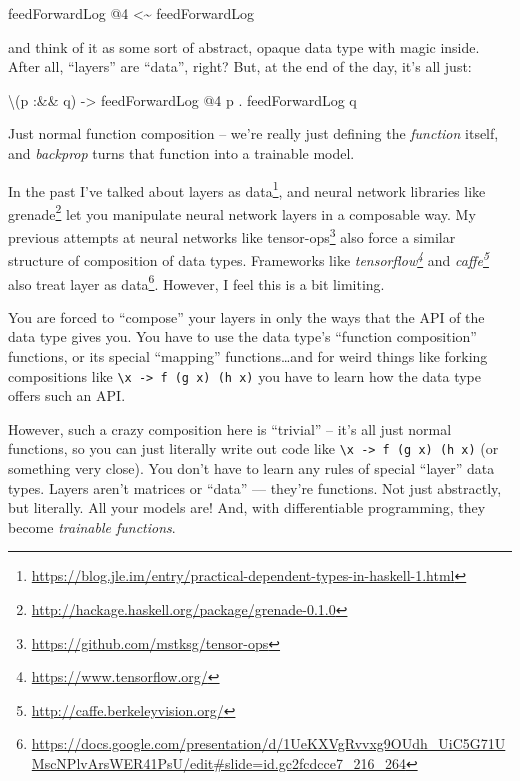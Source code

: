 \documentclass[]{article}
\newenvironment{Shaded}{}{}
\newcommand{\DecValTok}[1]{\textcolor[rgb]{0.25,0.63,0.44}{#1}}
\newcommand{\NormalTok}[1]{#1}
\newcommand{\OperatorTok}[1]{\textcolor[rgb]{0.40,0.40,0.40}{#1}}
\newcommand{\OtherTok}[1]{\textcolor[rgb]{0.00,0.44,0.13}{#1}}
\renewcommand{\href}[2]{#2\footnote{\url{#1}}}
\begin{document}
\begin{Shaded}
\begin{Highlighting}[]
\NormalTok{feedForwardLog }\OperatorTok{@}\DecValTok{4} \OperatorTok{<\textasciitilde{}}\NormalTok{ feedForwardLog}
\end{Highlighting}
\end{Shaded}

and think of it as some sort of abstract, opaque data type with magic inside.
After all, ``layers'' are ``data'', right? But, at the end of the day, it's all
just:

\begin{Shaded}
\begin{Highlighting}[]
\NormalTok{\textbackslash{}(p }\OperatorTok{:\&\&}\NormalTok{ q) }\OtherTok{{-}>}\NormalTok{ feedForwardLog }\OperatorTok{@}\DecValTok{4}\NormalTok{ p }\OperatorTok{.}\NormalTok{ feedForwardLog q}
\end{Highlighting}
\end{Shaded}

Just normal function composition -- we're really just defining the
\emph{function} itself, and \emph{backprop} turns that function into a trainable
model.

In the past I've talked about
\href{https://blog.jle.im/entry/practical-dependent-types-in-haskell-1.html}{layers
as data}, and neural network libraries like
\href{http://hackage.haskell.org/package/grenade-0.1.0}{grenade} let you
manipulate neural network layers in a composable way. My previous attempts at
neural networks like \href{https://github.com/mstksg/tensor-ops}{tensor-ops}
also force a similar structure of composition of data types. Frameworks like
\emph{\href{https://www.tensorflow.org/}{tensorflow}} and
\emph{\href{http://caffe.berkeleyvision.org/}{caffe}} also treat
\href{https://docs.google.com/presentation/d/1UeKXVgRvvxg9OUdh_UiC5G71UMscNPlvArsWER41PsU/edit\#slide=id.gc2fcdcce7_216_264}{layer
as data}. However, I feel this is a bit limiting.

You are forced to ``compose'' your layers in only the ways that the API of the
data type gives you. You have to use the data type's ``function composition''
functions, or its special ``mapping'' functions\ldots and for weird things like
forking compositions like
\texttt{\textbackslash{}x\ -\textgreater{}\ f\ (g\ x)\ (h\ x)} you have to learn
how the data type offers such an API.

However, such a crazy composition here is ``trivial'' -- it's all just normal
functions, so you can just literally write out code like
\texttt{\textbackslash{}x\ -\textgreater{}\ f\ (g\ x)\ (h\ x)} (or something
very close). You don't have to learn any rules of special ``layer'' data types.
Layers aren't matrices or ``data'' --- they're functions. Not just abstractly,
but literally. All your models are! And, with differentiable programming, they
become \emph{trainable functions}.
\end{document}
